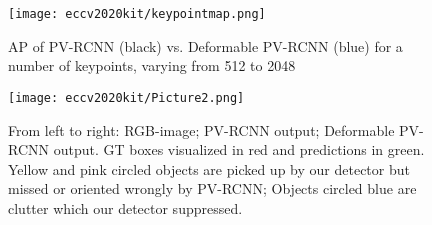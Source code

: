 \documentclass[runningheads]{llncs}
\begin{document}
\begin{figure}[t]
\centering
\texttt{[image: eccv2020kit/keypointmap.png]}
\caption{AP of PV-RCNN (black) vs. Deformable PV-RCNN (blue) for a number of keypoints, varying from 512 to 2048}
\label{fig:graph}
\end{figure}

\begin{figure}[h]
\centering
\texttt{[image: eccv2020kit/Picture2.png]}
\caption{From left to right: RGB-image; PV-RCNN output; Deformable PV-RCNN output. GT boxes visualized in red and predictions in green. Yellow and pink circled objects are picked up by our detector but missed or oriented wrongly by PV-RCNN; Objects circled blue are clutter which our detector suppressed.}
\label{fig:qual}
\end{figure}


\clearpage


\end{document}
